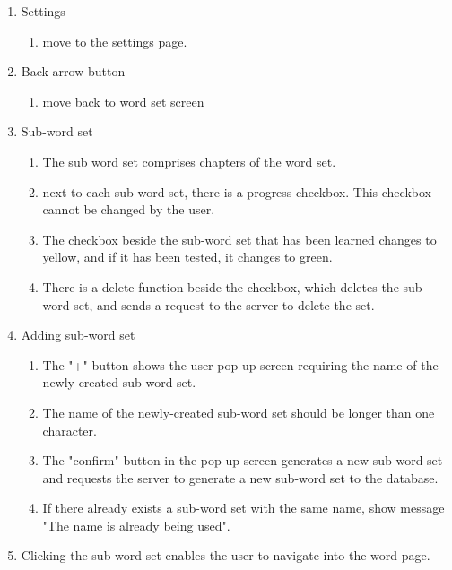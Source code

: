 \documentclass[conference]{IEEEtran}
\begin{document}
\begin{enumerate}
\begin{enumerate}
\begin{enumerate}
                \end{enumerate}
                \item Settings
                \begin{enumerate}
                    \item move to the settings page.
                \end{enumerate}
                \item Back arrow button
                \begin{enumerate}
                    \item move back to word set screen
                \end{enumerate}
                \item Sub-word set
                \begin{enumerate}
                    \item The sub word set comprises chapters of the word set.
                    \item next to each sub-word set, there is a progress checkbox. This checkbox cannot be changed by the user.
                    \item The checkbox beside the sub-word set that has been learned changes to yellow, and if it has been tested, it changes to green.
                    \item There is a delete function beside the checkbox, which deletes the sub-word set, and sends a request to the server to delete the set.
                \end{enumerate}
            \item Adding sub-word set
                \begin{enumerate}
                    \item The "+" button shows the user pop-up screen requiring the name of the newly-created sub-word set.
                    \item The name of the newly-created sub-word set should be longer than one character.
                    \item The "confirm" button in the pop-up screen generates a new sub-word set and requests the server to generate a new sub-word set to the database.
                    \item If there already exists a sub-word set with the same name, show message "The name is already being used".
                \end{enumerate}
            \item Clicking the sub-word set enables the user to navigate into the word page.

\end{enumerate}
\end{enumerate}
\end{document}
